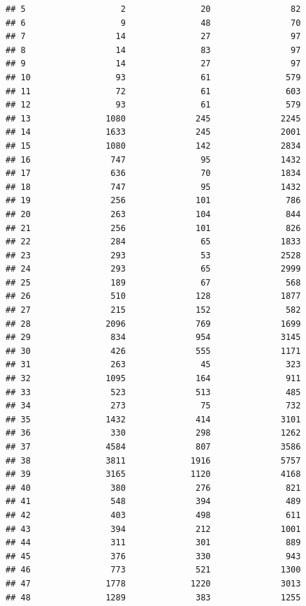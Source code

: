 \documentclass[10pt,handout,english]{beamer}\usepackage[]{graphicx}\usepackage[]{color}
\makeatletter
\newenvironment{kframe}{%
 \def\at@end@of@kframe{}%
 \ifinner\ifhmode%
  \def\at@end@of@kframe{\end{minipage}}%
  \begin{minipage}{\columnwidth}%
 \fi\fi%
 \def\FrameCommand##1{\hskip\@totalleftmargin \hskip-\fboxsep
 \colorbox{shadecolor}{##1}\hskip-\fboxsep
     \hskip-\linewidth \hskip-\@totalleftmargin \hskip\columnwidth}%
 \MakeFramed {\advance\hsize-\width
   \@totalleftmargin\z@ \linewidth\hsize
   \@setminipage}}%
 {\par\unskip\endMakeFramed%
 \at@end@of@kframe}
\newenvironment{knitrout}{}{} %
\makeatother
\begin{document}
\begin{frame}[fragile]
\begin{knitrout}
\begin{kframe}
\begin{verbatim}
## 5                   2               20                82
## 6                   9               48                70
## 7                  14               27                97
## 8                  14               83                97
## 9                  14               27                97
## 10                 93               61               579
## 11                 72               61               603
## 12                 93               61               579
## 13               1080              245              2245
## 14               1633              245              2001
## 15               1080              142              2834
## 16                747               95              1432
## 17                636               70              1834
## 18                747               95              1432
## 19                256              101               786
## 20                263              104               844
## 21                256              101               826
## 22                284               65              1833
## 23                293               53              2528
## 24                293               65              2999
## 25                189               67               568
## 26                510              128              1877
## 27                215              152               582
## 28               2096              769              1699
## 29                834              954              3145
## 30                426              555              1171
## 31                263               45               323
## 32               1095              164               911
## 33                523              513               485
## 34                273               75               732
## 35               1432              414              3101
## 36                330              298              1262
## 37               4584              807              3586
## 38               3811             1916              5757
## 39               3165             1120              4168
## 40                380              276               821
## 41                548              394               489
## 42                403              498               611
## 43                394              212              1001
## 44                311              301               889
## 45                376              330               943
## 46                773              521              1300
## 47               1778             1220              3013
## 48               1289              383              1255

\end{verbatim}
\end{kframe}
\end{knitrout}
\end{frame}
\end{document}
